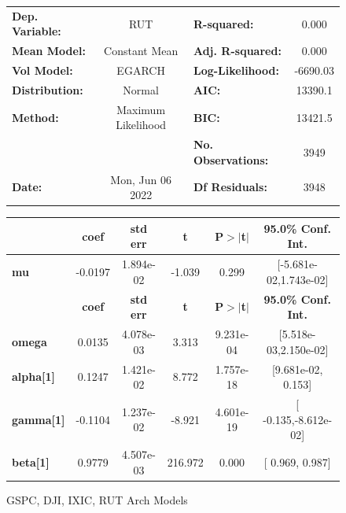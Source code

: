 \documentclass[a4paper, oneside]{discothesis}
\begin{document}
\begin{figure}
\begin{multicols}{2}
{  
\begin{center}
\begin{tabular}{lclc}
\toprule
\textbf{Dep. Variable:} &         RUT        & \textbf{  R-squared:         } &     0.000   \\
\textbf{Mean Model:}    &   Constant Mean    & \textbf{  Adj. R-squared:    } &     0.000   \\
\textbf{Vol Model:}     &       EGARCH       & \textbf{  Log-Likelihood:    } &   -6690.03  \\
\textbf{Distribution:}  &       Normal       & \textbf{  AIC:               } &    13390.1  \\
\textbf{Method:}        & Maximum Likelihood & \textbf{  BIC:               } &    13421.5  \\
\textbf{}               &                    & \textbf{  No. Observations:  } &    3949     \\
\textbf{Date:}          &  Mon, Jun 06 2022  & \textbf{  Df Residuals:      } &    3948     \\
\bottomrule
\end{tabular}
\begin{tabular}{lccccc}
            & \textbf{coef} & \textbf{std err} & \textbf{t} & \textbf{P$> |$t$|$} & \textbf{95.0\% Conf. Int.}  \\
\midrule
\textbf{mu} &      -0.0197  &    1.894e-02     &    -1.039  &          0.299       &   [-5.681e-02,1.743e-02]    \\
                  & \textbf{coef} & \textbf{std err} & \textbf{t} & \textbf{P$> |$t$|$} & \textbf{95.0\% Conf. Int.}  \\
\midrule
\textbf{omega}    &       0.0135  &    4.078e-03     &     3.313  &      9.231e-04       &   [5.518e-03,2.150e-02]     \\
\textbf{alpha[1]} &       0.1247  &    1.421e-02     &     8.772  &      1.757e-18       &    [9.681e-02,  0.153]      \\
\textbf{gamma[1]} &      -0.1104  &    1.237e-02     &    -8.921  &      4.601e-19       &    [ -0.135,-8.612e-02]     \\
\textbf{beta[1]}  &       0.9779  &    4.507e-03     &   216.972  &        0.000         &     [  0.969,  0.987]       \\
\bottomrule
\end{tabular}
\end{center}
}
\end{multicols}
\caption{GSPC, DJI, IXIC, RUT Arch Models}
\label{first_8}
\end{figure}
\end{document}
